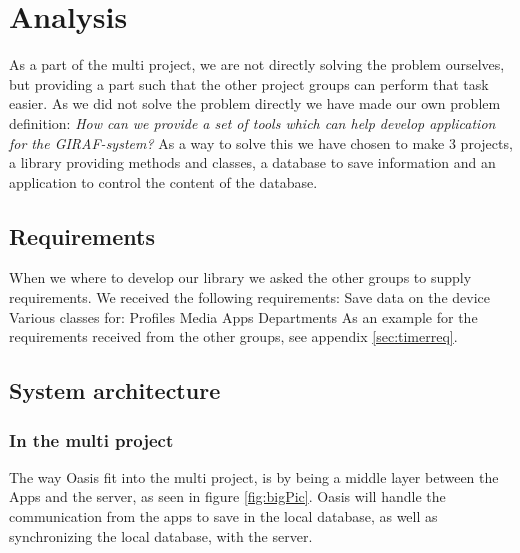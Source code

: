 \chapter{Analysis}
As a part of the multi project, we are not directly solving the problem ourselves, but providing a part such that the other project groups can perform that task easier.
As we did not solve the problem directly we have made our own problem definition:
	\textit{How can we provide a set of tools which can help develop application for the GIRAF-system?}
As a way to solve this we have chosen to make 3 projects, a library providing methods and classes, a database to save information and an application to control the content of the database. 

\section{Requirements}
When we where to develop our library we asked the other groups to supply requirements. We received the following requirements:
Save data on the device
Various classes for:
Profiles
Media
Apps
Departments
As an example for the requirements received from the other groups, see appendix \vref{sec:timerreq}.

\section{System architecture}
\subsection{In the multi project}
The way Oasis fit into the multi project, is by being a middle layer between the Apps and the server, as seen in figure \vref{fig:bigPic}. Oasis will handle the communication from the apps to save in the local database, as well as synchronizing the local database, with the server.


